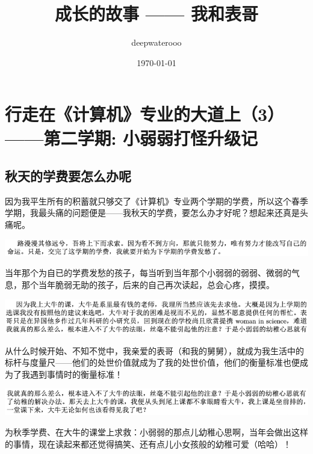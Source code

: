 \documentclass[9pt, b5paper]{article}
\author{deepwaterooo}
\date{\today}
\title{成长的故事 —— 我和表哥}
\begin{document}
\maketitle
\tableofcontents


\section{行走在《计算机》专业的大道上（3）——第二学期: 小弱弱打怪升级记}
\label{sec:orga7d9f7e}

\subsection{秋天的学费要怎么办呢}
\label{sec:org3813317}

因为我平生所有的积蓄就只够交了《计算机》专业两个学期的学费，所以这个春季学期，我最头痛的问题便是——我秋天的学费，要怎么办才好呢？想起来还真是头痛呢。 

\begin{center}
\includegraphics[width=.9\linewidth]{./pic/backups_plans_20210424_213617.png}
\end{center}

当年那个为自已的学费发愁的孩子，每当听到当年那个小弱弱的弱弱、微弱的气息，那个当年脆弱无助的孩子，后来的自己再次读起，总会心疼，摸摸。

\begin{center}
\includegraphics[width=.9\linewidth]{./pic/backups_plans_20210424_213859.png}
\end{center}

从什么时候开始、不知不觉中，我亲爱的表哥（和我的舅舅），就成为我生活中的标杆与度量尺——他们的处世价值就成为了我的处世价值，他们的衡量标准也便成为了我遇到事情时的衡量标准！

\begin{center}
\includegraphics[width=.9\linewidth]{./pic/backups_plans_20210424_213910.png}
\end{center}

为秋季学费、在大牛的课堂上求救：小弱弱的那点儿幼稚心思啊，当年会做出这样的事情，现在读起来都还觉得搞笑、还有点儿小女孩般的幼稚可爱（哈哈）！
\end{document}
